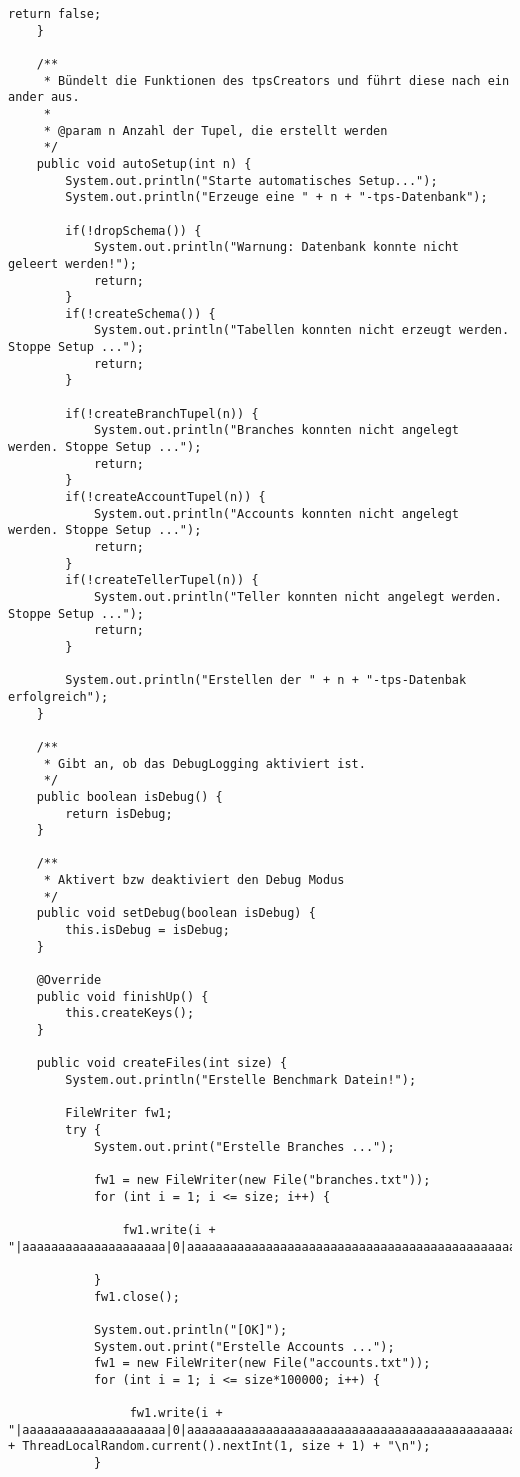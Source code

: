 \begin{lstlisting}[caption={tpsCreator (optimiert)}, label={lst:tpsv2}]
		return false;
	}
	
	/**
	 * Bündelt die Funktionen des tpsCreators und führt diese nach ein ander aus.
	 * 
	 * @param n Anzahl der Tupel, die erstellt werden
	 */
	public void autoSetup(int n) {
		System.out.println("Starte automatisches Setup...");
		System.out.println("Erzeuge eine " + n + "-tps-Datenbank");
		
		if(!dropSchema()) {
			System.out.println("Warnung: Datenbank konnte nicht geleert werden!");
			return;
		}
		if(!createSchema()) {
			System.out.println("Tabellen konnten nicht erzeugt werden. Stoppe Setup ...");
			return;
		}
		
		if(!createBranchTupel(n)) {
			System.out.println("Branches konnten nicht angelegt werden. Stoppe Setup ...");
			return;
		}
		if(!createAccountTupel(n)) {
			System.out.println("Accounts konnten nicht angelegt werden. Stoppe Setup ...");
			return;
		}
		if(!createTellerTupel(n)) {
			System.out.println("Teller konnten nicht angelegt werden. Stoppe Setup ...");
			return;
		}

		System.out.println("Erstellen der " + n + "-tps-Datenbak erfolgreich");
	}

	/**
	 * Gibt an, ob das DebugLogging aktiviert ist.
	 */
	public boolean isDebug() {
		return isDebug;
	}
	
	/**
	 * Aktivert bzw deaktiviert den Debug Modus
	 */
	public void setDebug(boolean isDebug) {
		this.isDebug = isDebug;
	}

	@Override
	public void finishUp() {
		this.createKeys();
	}

	public void createFiles(int size) {
		System.out.println("Erstelle Benchmark Datein!");

		FileWriter fw1;
		try {
			System.out.print("Erstelle Branches ...");

			fw1 = new FileWriter(new File("branches.txt"));
			for (int i = 1; i <= size; i++) {
				
				fw1.write(i + "|aaaaaaaaaaaaaaaaaaaa|0|aaaaaaaaaaaaaaaaaaaaaaaaaaaaaaaaaaaaaaaaaaaaaaaaaaaaaaaaaaaaaaaaaaaaaaaa\n");
				
			}
			fw1.close();
			
			System.out.println("[OK]");
			System.out.print("Erstelle Accounts ...");			
			fw1 = new FileWriter(new File("accounts.txt"));
			for (int i = 1; i <= size*100000; i++) {

				 fw1.write(i + "|aaaaaaaaaaaaaaaaaaaa|0|aaaaaaaaaaaaaaaaaaaaaaaaaaaaaaaaaaaaaaaaaaaaaaaaaaaaaaaaaaaaaaaaaaaa|" + ThreadLocalRandom.current().nextInt(1, size + 1) + "\n");
			}
			

\end{lstlisting}
